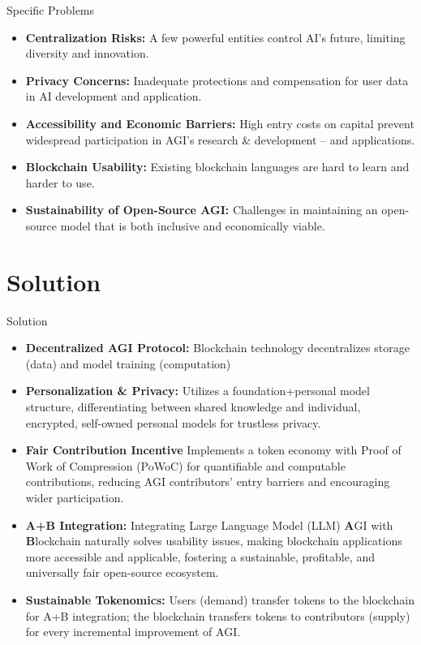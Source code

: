 \documentclass{beamer}
\begin{document}
\begin{frame}{Specific Problems}
\begin{itemize}
    \item \textbf{Centralization Risks: } A few powerful entities control AI's future, limiting diversity and innovation.
	\item \textbf{Privacy Concerns: } Inadequate protections and compensation for user data in AI development and application.
	\item \textbf{Accessibility and Economic Barriers: } High entry costs on capital prevent widespread participation in AGI's research \& development -- and applications.
	\item \textbf{Blockchain Usability: } Existing blockchain languages are hard to learn and harder to use.
	\item \textbf{Sustainability of Open-Source AGI: } Challenges in maintaining an open-source model that is both inclusive and economically viable.
\end{itemize}
\end{frame}

\section{Solution}
\begin{frame}{Solution}
\begin{itemize}
    \item \textbf{Decentralized AGI Protocol: } {\footnotesize Blockchain technology decentralizes storage (data) and model training (computation)}
    \item \textbf{Personalization \& Privacy: } {\footnotesize Utilizes a foundation+personal model structure, differentiating between shared knowledge and individual, encrypted, self-owned personal models for trustless privacy.}
    \item \textbf{Fair Contribution Incentive} {\footnotesize Implements a token economy with Proof of Work of Compression (PoWoC) for quantifiable and computable contributions, reducing AGI contributors' entry barriers and encouraging wider participation.}
    \item \textbf{A+B Integration: } {\footnotesize Integrating Large Language Model (LLM) \textbf{A}GI with \textbf{B}lockchain naturally solves usability issues, making blockchain applications more accessible and applicable, fostering a sustainable, profitable, and universally fair open-source ecosystem.}
    \item \textbf{Sustainable Tokenomics: } {\footnotesize Users (demand) transfer tokens to the blockchain for A+B integration; the blockchain transfers tokens to contributors (supply) for every incremental improvement of AGI.}
\end{itemize}
\end{frame}
\end{document}
